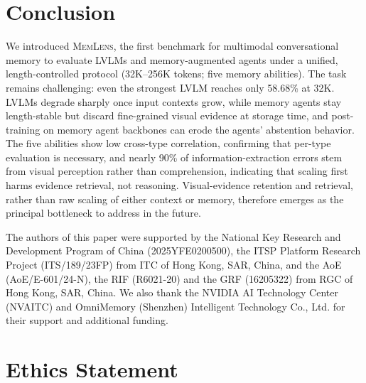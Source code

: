 \documentclass{article}
\newcommand{\bench}{\textsc{MemLens}}
\begin{document}
\section{Conclusion}
\label{sec:conclusion}

We introduced \bench{}, the first benchmark for multimodal conversational memory to evaluate LVLMs and memory-augmented agents under a unified, length-controlled protocol (32K–256K tokens; five memory abilities). The task remains challenging: even the strongest LVLM reaches only 58.68\% at 32K. LVLMs degrade sharply once input contexts grow, while memory agents stay length-stable but discard fine-grained visual evidence at storage time, and post-training on memory agent backbones can erode the agents' abstention behavior. The five abilities show low cross-type correlation, confirming that per-type evaluation is necessary, and nearly 90\% of information-extraction errors stem from visual perception rather than comprehension, indicating that scaling first harms evidence retrieval, not reasoning. Visual-evidence retention and retrieval, rather than raw scaling of either context or memory, therefore emerges as the principal bottleneck to address in the future.



\begin{ack}
The authors of this paper were supported by the National Key Research and Development Program of China (2025YFE0200500), the ITSP Platform Research Project (ITS/189/23FP) from ITC of Hong Kong, SAR, China, and the AoE (AoE/E-601/24-N), the RIF (R6021-20) and the GRF (16205322) from RGC of Hong Kong, SAR, China. We also thank the NVIDIA AI Technology Center (NVAITC) and OmniMemory (Shenzhen) Intelligent Technology Co., Ltd. for their support and additional funding.
\end{ack}

\section*{Ethics Statement}
\end{document}
